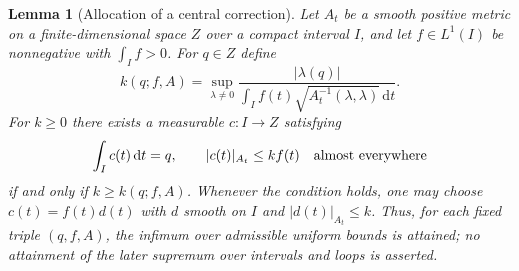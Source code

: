 \documentclass[10pt,a4paper]{article}
\numberwithin{equation}{section}
\newtheorem{lemma}[theorem]{Lemma}
\theoremstyle{definition}
\theoremstyle{remark}
\newcommand{\dd}{\mathrm d}
\begin{document}
\begin{lemma}[Allocation of a central correction]
\label{lem:central-allocation}
Let $A_t$ be a smooth positive metric on a finite-dimensional space $Z$
over a compact interval $I$, and let $f\in L^1(I)$ be nonnegative with
$\int_I f>0$.  For $q\in Z$ define
\[
 k(q;f,A)=\sup_{\lambda\ne0}
 \frac{|\lambda(q)|}{\int_I f(t)
                  \sqrt{A_t^{-1}(\lambda,\lambda)}\,\dd t}.
\]
For $k\ge0$ there exists a measurable $c:I\to Z$ satisfying
\[
 \int_I c(t)\,\dd t=q,\qquad |c(t)|_{A_t}\le kf(t)
 \quad\hbox{almost everywhere}
\]
if and only if $k\ge k(q;f,A)$.  Whenever the condition holds, one may
choose $c(t)=f(t)d(t)$ with $d$ smooth on $I$ and
$|d(t)|_{A_t}\le k$.  Thus, for each fixed triple $(q,f,A)$, the
infimum over admissible uniform bounds is attained; no attainment of the
later supremum over intervals and loops is asserted.
\end{lemma}
\end{document}
